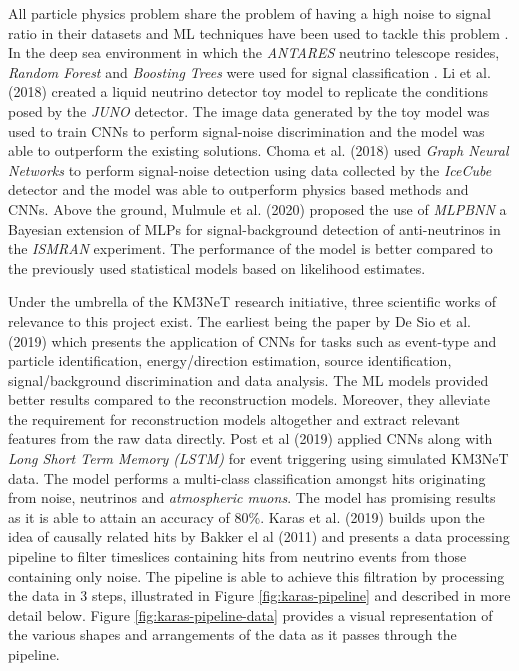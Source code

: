 All particle physics problem share the problem of having a high noise
to signal ratio in their datasets and ML techniques have been used to
tackle this problem \cite{mulmule2020machine, li2018deep,
  choma2018graph, neff2012signal}. In the deep sea environment in
which the \emph{ANTARES} neutrino telescope resides, \emph{Random
Forest} and \emph{Boosting Trees} were used for signal classification
\cite{neff2012signal}. Li et al. (2018) created a liquid neutrino
detector toy model to replicate the conditions posed by the
\emph{JUNO} detector. The image data generated by the toy model was
used to train CNNs to perform signal-noise discrimination and the
model was able to outperform the existing solutions. Choma et al.
(2018) used \emph{Graph Neural Networks} to perform signal-noise
detection using data collected by the \emph{IceCube} detector and the
model was able to outperform physics based methods and CNNs. Above the
ground, Mulmule et al. (2020) proposed the use of \emph{MLPBNN} a
Bayesian extension of MLPs for signal-background detection of
anti-neutrinos in the \emph{ISMRAN} experiment. The performance of the
model is better compared to the previously used statistical models
based on likelihood estimates.

Under the umbrella of the KM3NeT research initiative, three scientific
works of relevance to this project exist. The earliest being the paper
by De Sio et al. (2019) which presents the application of CNNs for
tasks such as event-type and particle identification, energy/direction
estimation, source identification, signal/background discrimination
and data analysis. The ML models provided better results compared to
the reconstruction models. Moreover, they alleviate the requirement
for reconstruction models altogether and extract relevant features
from the raw data directly. Post et al (2019) applied CNNs
\cite{krizhevsky2012imagenet} along with \emph{Long Short Term Memory
(LSTM)} \cite{sainath2015convolutional} for event triggering using
simulated KM3NeT data. The model performs a multi-class classification
amongst hits originating from noise, neutrinos and \emph{atmospheric
muons}. The model has promising results as it is able to attain an
accuracy of 80\%. Karas et al. (2019) builds upon the idea of causally
related hits by Bakker el al (2011) and presents a data processing
pipeline to filter timeslices containing hits from neutrino events
from those containing only noise. The pipeline is able to achieve this
filtration by processing the data in 3 steps, illustrated in Figure
\ref{fig:karas-pipeline} and described in more detail below. Figure
\ref{fig:karas-pipeline-data} provides a visual representation of the
various shapes and arrangements of the data as it passes through the
pipeline.

